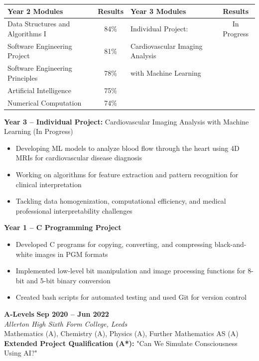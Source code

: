 \documentclass[a4paper,11pt]{article}
\begin{document}
\vspace{0.15cm}

\begin{tabularx}{\textwidth}{|X|c|X|c|}
\hline
\textbf{Year 2 Modules} & \textbf{Results} & \textbf{Year 3 Modules} & \textbf{Results} \\
\hline
Data Structures and Algorithms I & 84\% & Individual Project: & In Progress \\
Software Engineering Project & 81\% & Cardiovascular Imaging Analysis & \\
Software Engineering Principles & 78\% & with Machine Learning & \\
Artificial Intelligence & 75\% & & \\
Numerical Computation & 74\% & & \\
\hline
\end{tabularx}

\vspace{0.15cm}

\textbf{Year 3 -- Individual Project:} Cardiovascular Imaging Analysis with Machine Learning (In Progress)
\begin{itemize}[leftmargin=1em, itemsep=0.05em]
    \item Developing ML models to analyze blood flow through the heart using 4D MRIs for cardiovascular disease diagnosis
    \item Working on algorithms for feature extraction and pattern recognition for clinical interpretation
    \item Tackling data homogenization, computational efficiency, and medical professional interpretability challenges
\end{itemize}

\textbf{Year 1 -- C Programming Project}
\begin{itemize}[leftmargin=1em, itemsep=0.05em]
    \item Developed C programs for copying, converting, and compressing black-and-white images in PGM formats
    \item Implemented low-level bit manipulation and image processing functions for 8-bit and 5-bit binary conversion
    \item Created bash scripts for automated testing and used Git for version control
\end{itemize}

\vspace{0.1cm}

\textbf{A-Levels} \hfill \textbf{Sep 2020 -- Jun 2022}\\
\textit{Allerton High Sixth Form College, Leeds}\\
Mathematics (A), Chemistry (A), Physics (A), Further Mathematics AS (A)\\
\textbf{Extended Project Qualification (A*):} "Can We Simulate Consciousness Using AI?"
\end{document}

